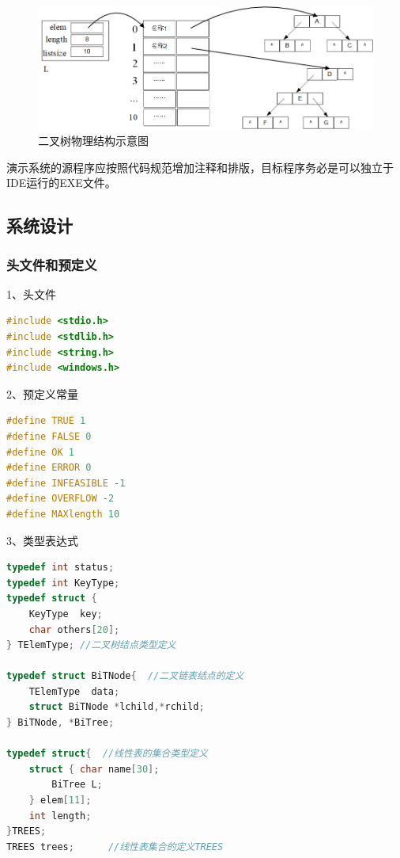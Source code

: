 \documentclass[supercite]{Experimental_Report}
\theoremstyle{definition}
\begin{document}
\begin{figure}[htbp] %
    \vspace{0.8cm}
	\begin{center}
		\includegraphics[scale=0.7]{images/二叉树物理结构.png}
		\caption{二叉树物理结构示意图}
		\label{fig1-1}
	\end{center}
\end{figure}

演示系统的源程序应按照代码规范增加注释和排版，目标程序务必是可以独立于IDE运行的EXE文件。

\subsection{系统设计}

\subsubsection{头文件和预定义}

1、头文件

\begin{lstlisting}[language=c]
#include <stdio.h>
#include <stdlib.h>
#include <string.h>
#include <windows.h>
\end{lstlisting}

2、预定义常量

\begin{lstlisting}[language=c]
#define TRUE 1
#define FALSE 0
#define OK 1
#define ERROR 0
#define INFEASIBLE -1
#define OVERFLOW -2
#define MAXlength 10

\end{lstlisting}

3、类型表达式

\begin{lstlisting}[language=c]
typedef int status;
typedef int KeyType;
typedef struct {
    KeyType  key;
    char others[20];
} TElemType; //二叉树结点类型定义

typedef struct BiTNode{  //二叉链表结点的定义
    TElemType  data;
    struct BiTNode *lchild,*rchild;
} BiTNode, *BiTree;

typedef struct{  //线性表的集合类型定义
    struct { char name[30];
        BiTree L;
    } elem[11];
    int length;
}TREES;
TREES trees;      //线性表集合的定义TREES
\end{lstlisting}
\end{document}
